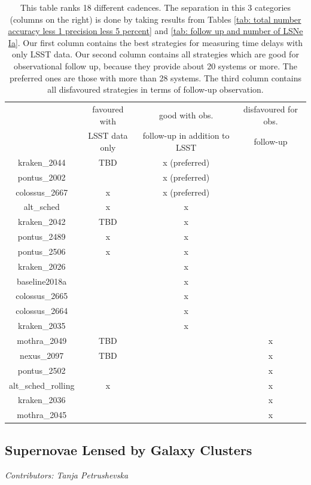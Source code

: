 %
\begin{table}
\centering
\begin{tabular}{c|c|c|c}
& favoured with  & good with obs. & disfavoured for  obs. \\
& LSST data only &  follow-up in addition to LSST & follow-up\\
\hline
kraken\_2044 & TBD & x (preferred) & \\
\hline
pontus\_2002 & & x (preferred) &   \\
\hline
colossus\_2667 & x & x (preferred) & \\
\hline
alt\_sched & x  & x & \\
\hline
kraken\_2042 & TBD & x & \\
\hline
pontus\_2489 & x & x & \\
\hline
pontus\_2506 & x & x \\
\hline
kraken\_2026 & & x & \\
\hline
baseline2018a & & x &    \\
\hline
colossus\_2665 & & x &   \\
\hline
colossus\_2664 & & x &   \\
\hline
kraken\_2035 & & x &    \\
\hline
mothra\_2049 & TBD & & x  \\
\hline
nexus\_2097 & TBD  & & x  \\
\hline
pontus\_2502 &&  &x  \\
\hline
alt\_sched\_rolling & x & & x  \\
\hline
kraken\_2036 & & & x  \\
\hline
mothra\_2045 & & & x  \\
\end{tabular}
\caption{This table ranks 18 different cadences. The separation in
  this 3 categories (columns on the right) is done by taking results
  from Tables \ref{tab: total number accuracy less 1 precision less 5 percent} and
  \ref{tab: follow up and number of LSNe Ia}. Our first column contains the best strategies for
  measuring time delays with only LSST data. Our second column
  contains all strategies which are good for observational
  follow up, because they provide about 20 systems or more. The preferred ones are those with more than 28 systems. The third column
  contains all disfavoured strategies in terms of follow-up
  observation.}
\label{tab: favoured strategies}
\end{table}
%
\FloatBarrier
\subsection{Supernovae Lensed by Galaxy Clusters}
\textit{Contributors: Tanja Petrushevska}

